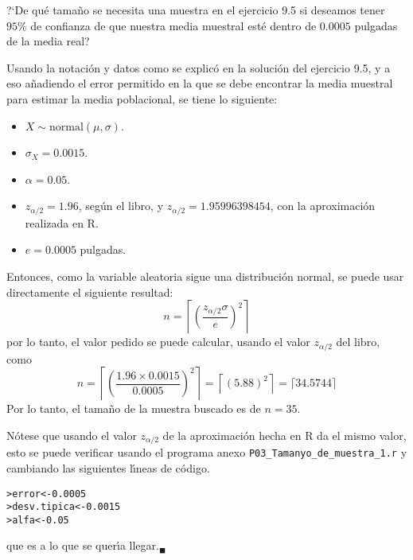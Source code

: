 \begin{enunciado}
 ?`De qu\'e tama\~no se necesita una muestra en el ejercicio 9.5 si deseamos tener $95\%$ de confianza de que nuestra media muestral est\'e dentro de $0.0005$ pulgadas de la media real?
\end{enunciado}

\begin{solucion}
 Usando la notaci\'on y datos como se explic\'o en la soluci\'on del ejercicio 9.5, y a eso a\~nadiendo el error permitido en la que se debe encontrar la media muestral para estimar la media poblacional, se tiene lo siguiente:
 \begin{itemize}
  \item $X\sim\text{normal}(\mu,\sigma)$.
  \item $\sigma_X = 0.0015$.
  \item $\alpha=0.05$.
  \item $z_{\alpha/2}=1.96$, seg\'un el libro, y $z_{\alpha/2}=1.95996398454$, con la aproximaci\'on realizada en R. 
  \item $e=0.0005$ pulgadas.
 \end{itemize}
 Entonces, como la variable aleatoria sigue una distribuci\'on normal, se puede usar directamente el siguiente resultad:
 \begin{equation*}
  n = \left\lceil \left( \frac{z_{\alpha/2} \sigma}{e} \right)^2 \right\rceil
 \end{equation*}
 por lo tanto, el valor pedido se puede calcular, usando el valor $z_{\alpha/2}$ del libro, como
 \begin{equation*}
  n = \left\lceil \left( \frac{1.96\times 0.0015}{0.0005}\right)^2 \right\rceil = \left\lceil \left( 5.88 \right)^2 \right\rceil = \lceil 34.5744 \rceil
 \end{equation*}
 Por lo tanto, el tama\~no de la muestra buscado es de $n=35$.
 \par 
 N\'otese que usando el valor $z_{\alpha/2}$ de la aproximaci\'on hecha en R da el mismo valor, esto se puede verificar usando el programa anexo \texttt{P03\_Tamanyo\_de\_muestra\_1.r} y cambiando las siguientes l\'{\i}neas de c\'odigo.
 \begin{verbatim}
>error<-0.0005
>desv.tipica<-0.0015
>alfa<-0.05
 \end{verbatim}
 \vspace{-0.5cm}
 que es a lo que se quer\'{\i}a llegar.${}_{\blacksquare}$
\end{solucion}

